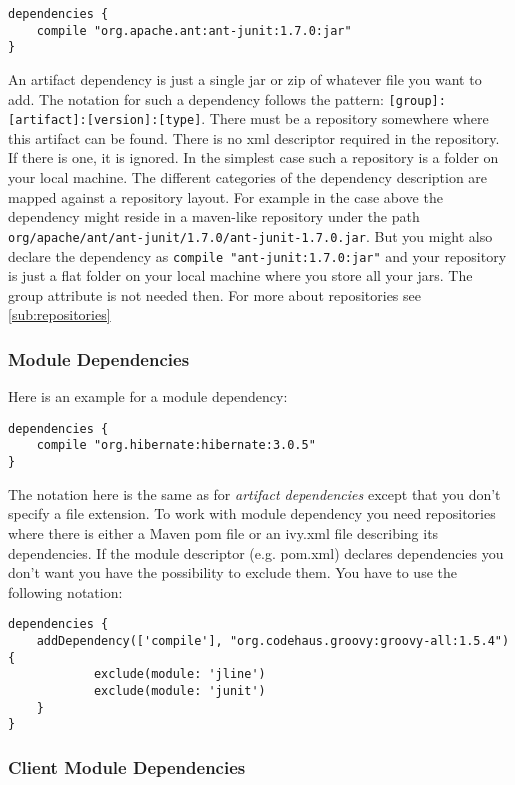 \begin{Verbatim}
dependencies {
	compile "org.apache.ant:ant-junit:1.7.0:jar"
}
\end{Verbatim}

An artifact dependency is just a single jar or zip of whatever file you want to add. The notation for such a dependency follows the  pattern: \texttt{[group]:[artifact]:[version]:[type]}. There must be a repository somewhere where this artifact can be found. There is no xml descriptor required in the repository. If there is one, it is ignored. In the simplest case such a repository is a folder on your local machine. The different categories of the dependency description are mapped against a repository layout. For example in the case above the dependency might reside in a maven-like repository under the path \texttt{org/apache/ant/ant-junit/1.7.0/ant-junit-1.7.0.jar}. But you might also declare the dependency as \texttt{compile "ant-junit:1.7.0:jar"} and your repository is just a flat folder on your local machine where you store all your jars. The group attribute is not needed then. For more about repositories see \ref{sub:repositories}

\subsubsection{Module Dependencies} %
\label{ssub:module_dependencies}
Here is an example for a module dependency:

\begin{Verbatim}
dependencies {
	compile "org.hibernate:hibernate:3.0.5"
}
\end{Verbatim}

The notation here is the same as for \emph{artifact dependencies} except that you don't specify a file extension. To work with module dependency you need repositories where there is either a Maven pom file or an ivy.xml file describing its dependencies. If the module descriptor (e.g. pom.xml) declares dependencies you don't want you have the possibility to exclude them. You have to use the following notation:

\begin{Verbatim}
dependencies {
	addDependency(['compile'], "org.codehaus.groovy:groovy-all:1.5.4") {
	        exclude(module: 'jline')
	        exclude(module: 'junit')
	}
}
\end{Verbatim}


\subsubsection{Client Module Dependencies} %
\label{ssub:client_module_dependencies}

